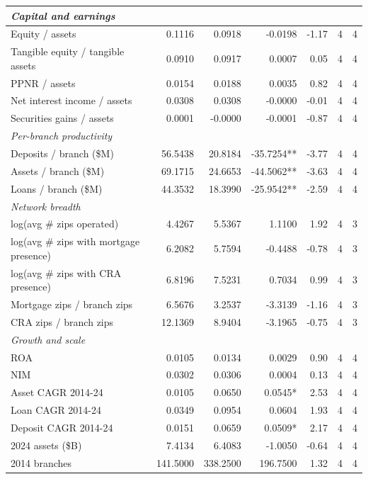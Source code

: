 \begin{tabular}{lrrrrrr}
\midrule
\multicolumn{7}{l}{\emph{Capital and earnings}} \\
\midrule
Equity / assets & 0.1116 & 0.0918 & -0.0198 & -1.17 & 4 & 4 \\
Tangible equity / tangible assets & 0.0910 & 0.0917 & 0.0007 & 0.05 & 4 & 4 \\
PPNR / assets & 0.0154 & 0.0188 & 0.0035 & 0.82 & 4 & 4 \\
Net interest income / assets & 0.0308 & 0.0308 & -0.0000 & -0.01 & 4 & 4 \\
Securities gains / assets & 0.0001 & -0.0000 & -0.0001 & -0.87 & 4 & 4 \\
\midrule
\multicolumn{7}{l}{\emph{Per-branch productivity}} \\
\midrule
Deposits / branch (\$M) & 56.5438 & 20.8184 & -35.7254** & -3.77 & 4 & 4 \\
Assets / branch (\$M) & 69.1715 & 24.6653 & -44.5062** & -3.63 & 4 & 4 \\
Loans / branch (\$M) & 44.3532 & 18.3990 & -25.9542** & -2.59 & 4 & 4 \\
\midrule
\multicolumn{7}{l}{\emph{Network breadth}} \\
\midrule
log(avg \# zips operated) & 4.4267 & 5.5367 & 1.1100 & 1.92 & 4 & 3 \\
log(avg \# zips with mortgage presence) & 6.2082 & 5.7594 & -0.4488 & -0.78 & 4 & 3 \\
log(avg \# zips with CRA presence) & 6.8196 & 7.5231 & 0.7034 & 0.99 & 4 & 3 \\
Mortgage zips / branch zips & 6.5676 & 3.2537 & -3.3139 & -1.16 & 4 & 3 \\
CRA zips / branch zips & 12.1369 & 8.9404 & -3.1965 & -0.75 & 4 & 3 \\
\midrule
\multicolumn{7}{l}{\emph{Growth and scale}} \\
\midrule
ROA & 0.0105 & 0.0134 & 0.0029 & 0.90 & 4 & 4 \\
NIM & 0.0302 & 0.0306 & 0.0004 & 0.13 & 4 & 4 \\
Asset CAGR 2014-24 & 0.0105 & 0.0650 & 0.0545* & 2.53 & 4 & 4 \\
Loan CAGR 2014-24 & 0.0349 & 0.0954 & 0.0604 & 1.93 & 4 & 4 \\
Deposit CAGR 2014-24 & 0.0151 & 0.0659 & 0.0509* & 2.17 & 4 & 4 \\
2024 assets (\$B) & 7.4134 & 6.4083 & -1.0050 & -0.64 & 4 & 4 \\
2014 branches & 141.5000 & 338.2500 & 196.7500 & 1.32 & 4 & 4 \\

\end{tabular}
